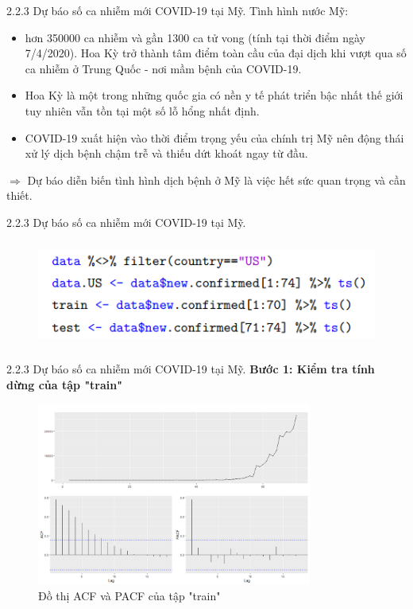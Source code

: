 \documentclass[notheorems,envcountsect,hyperref=unicode]{beamer}
\begin{document}
\begin{frame}{2.2.3 Dự báo số ca nhiễm mới COVID-19 tại Mỹ.}
Tình hình nước Mỹ:
	\pause
	\begin{itemize}
		\item hơn 350000 ca nhiễm và gần 1300 ca tử vong (tính tại thời điểm ngày 7/4/2020). Hoa Kỳ trở thành tâm điểm toàn cầu của đại dịch khi vượt qua số ca nhiễm ở Trung Quốc - nơi mầm bệnh của COVID-19.
		\pause
		\item Hoa Kỳ là một trong những quốc gia có nền y tế phát triển bậc nhất thế giới tuy nhiên vẫn tồn tại một số lỗ hổng nhất định.
		\pause
		\item COVID-19 xuất hiện vào thời điểm trọng yếu của chính trị Mỹ nên động thái xử lý dịch bệnh chậm trễ và thiếu dứt khoát ngay từ đầu.
	\end{itemize}
$\Longrightarrow$ Dự báo diễn biến tình hình dịch bệnh ở Mỹ là việc hết sức quan trọng và cần thiết.
\end{frame}

\begin{frame}{2.2.3 Dự báo số ca nhiễm mới COVID-19 tại Mỹ.}
	\begin{figure}[!htb]
		\centering
		\includegraphics[width=1\linewidth,height=3.5cm]{t1} 
	\end{figure}
\end{frame}

\begin{frame}{2.2.3 Dự báo số ca nhiễm mới COVID-19 tại Mỹ.}
\textbf{Bước 1: Kiểm tra tính dừng của tập "train"}
\begin{figure}[!htb]
	\centering
	\includegraphics[width=1\linewidth,height=6cm]{US1}
	\caption{Đồ thị ACF và PACF của tập "train"}  
\end{figure}
\end{frame}
\end{document}
